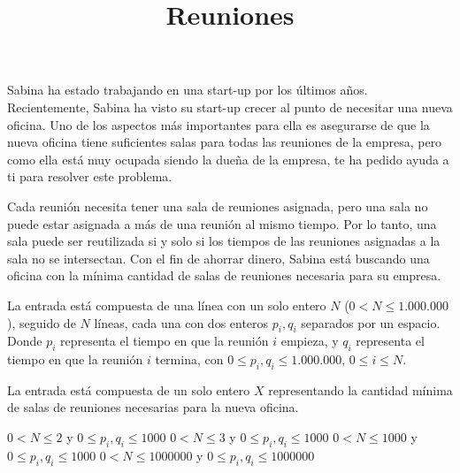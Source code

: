 \documentclass{oci}
\title{Reuniones}
\begin{document}
\begin{problemDescription}
    Sabina ha estado trabajando en una start-up por los últimos años. Recientemente, Sabina ha visto su start-up
    crecer al punto de necesitar una nueva oficina. Uno de los aspectos más importantes para ella es
    asegurarse de que la nueva oficina tiene suficientes salas para todas las reuniones de la empresa, pero como
    ella está muy ocupada siendo la dueña de la empresa, te ha pedido ayuda a ti para resolver este problema.

    Cada reunión necesita tener una sala de reuniones asignada, pero una sala no puede estar asignada a más de
    una reunión al mismo tiempo. Por lo tanto, una sala puede ser reutilizada si y solo si los tiempos de las
    reuniones asignadas a la sala no se intersectan. Con el fin de ahorrar dinero, Sabina está buscando una
    oficina con la mínima cantidad de salas de reuniones necesaria para su empresa.
\end{problemDescription}

\begin{inputDescription}
    La entrada está compuesta de una línea con un solo entero $N$ ($0 < N \leq 1.000.000$), seguido de $N$ líneas,
    cada una con dos enteros $p_i, q_i$ separados por un espacio. Donde $p_i$ representa el tiempo
    en que la reunión $i$ empieza, y $q_i$ representa el tiempo en que la reunión $i$ termina, con
    $0 \leq p_i, q_i \leq 1.000.000$, $0 \leq i \leq N$.
\end{inputDescription}

\begin{outputDescription}
    La entrada está compuesta de un solo entero $X$ representando la cantidad mínima de salas de reuniones
    necesarias para la nueva oficina.
\end{outputDescription}

\begin{scoreDescription}
  $0 < N \leq 2$ y $0 \leq p_i, q_i \leq 1000$
  $0 < N \leq 3$ y $0 \leq p_i, q_i \leq 1000$
  $0 < N \leq 1000$ y $0 \leq p_i, q_i \leq 1000$
  $0 < N \leq 1000000$ y $0 \leq p_i, q_i \leq 1000000$
\end{scoreDescription}

\begin{sampleDescription}
\end{sampleDescription}
\end{document}
